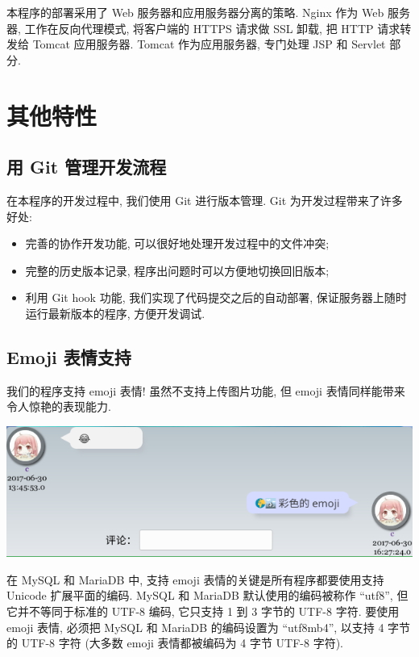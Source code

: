 \documentclass[a4paper,10pt]{article}
\begin{document}
本程序的部署采用了 Web 服务器和应用服务器分离的策略. Nginx 作为 Web 服务器, 工作在反向代理模式, 将客户端的 HTTPS 请求做 SSL 卸载, 把 HTTP 请求转发给 Tomcat 应用服务器. Tomcat 作为应用服务器, 专门处理 JSP 和 Servlet 部分.

\section{其他特性}

\subsection{用 Git 管理开发流程}

在本程序的开发过程中, 我们使用 Git 进行版本管理. Git 为开发过程带来了许多好处:
\begin{itemize}
	\item 完善的协作开发功能, 可以很好地处理开发过程中的文件冲突;
	\item 完整的历史版本记录, 程序出问题时可以方便地切换回旧版本;
	\item 利用 Git hook 功能, 我们实现了代码提交之后的自动部署, 保证服务器上随时运行最新版本的程序, 方便开发调试.
\end{itemize}

\subsection{Emoji 表情支持}

我们的程序支持 emoji 表情! 虽然不支持上传图片功能, 但 emoji 表情同样能带来令人惊艳的表现能力.

\begin{center}
	\includegraphics[scale=0.6]{emoji.png}
\end{center}

在 MySQL 和 MariaDB 中, 支持 emoji 表情的关键是所有程序都要使用支持 Unicode 扩展平面的编码. MySQL 和 MariaDB 默认使用的编码被称作 ``utf8'', 但它并不等同于标准的 UTF-8 编码, 它只支持 1 到 3 字节的 UTF-8 字符. 要使用 emoji 表情, 必须把 MySQL 和 MariaDB 的编码设置为 ``utf8mb4'', 以支持 4 字节的 UTF-8 字符 (大多数 emoji 表情都被编码为 4 字节 UTF-8 字符).
\end{document}
